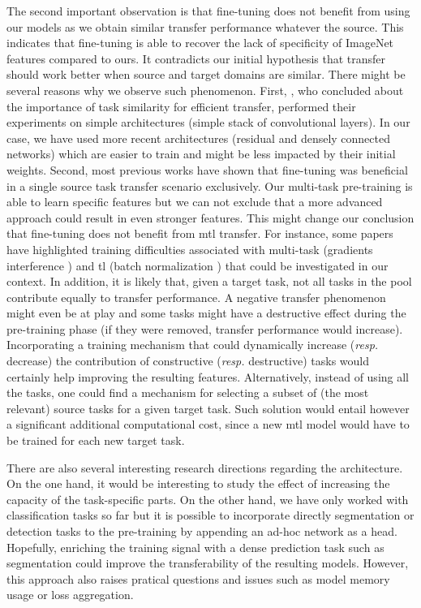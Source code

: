 The second important observation is that fine-tuning does not benefit from using our models as we obtain similar transfer performance whatever the source. This indicates that fine-tuning is able to recover the lack of specificity of ImageNet features compared to ours. It contradicts our initial hypothesis that transfer should work better when source and target domains are similar. There might be several reasons why we observe such phenomenon. First, \citeauthor{yosinski2014transferable} \cite{yosinski2014transferable}, who concluded about the importance of task similarity for efficient transfer, performed their experiments on simple architectures (\eg simple stack of convolutional layers). In our case, we have used more recent architectures (\ie residual and densely connected networks) which are easier to train and might be less impacted by their initial weights. Second, most previous works have shown that fine-tuning was beneficial in a single source task transfer scenario exclusively. Our multi-task pre-training is able to learn specific features but we can not exclude that a more advanced approach could result in even stronger features. This might change our conclusion that fine-tuning does not benefit from \acrshort{mtl} transfer. For instance, some papers have highlighted training difficulties associated with multi-task (\eg gradients interference \cite{yu2020gradient}) and \acrlong{tl} (\eg batch normalization \cite{chang2019domain}) that could be investigated in our context. In addition, it is likely that, given a target task, not all tasks in the pool contribute equally to transfer performance. A negative transfer phenomenon might even be at play and some tasks might have a destructive effect during the pre-training phase (\ie if they were removed, transfer performance would increase). Incorporating a training mechanism that could dynamically increase (\textit{resp.} decrease) the contribution of constructive (\textit{resp.} destructive) tasks would certainly help improving the resulting features. Alternatively, instead of using all the tasks, one could find a mechanism for selecting a subset of (the most relevant) source tasks for a given target task. Such solution would entail however a significant additional computational cost, since a new \acrshort{mtl} model would have to be trained for each new target task.

There are also several interesting research directions regarding the architecture. On the one hand, it would be interesting to study the effect of increasing the capacity of the task-specific parts. On the other hand, we have only worked with classification tasks so far but it is possible to incorporate directly segmentation or detection tasks to the pre-training by appending an ad-hoc network as a head. Hopefully, enriching the training signal with a dense prediction task such as segmentation could improve the transferability of the resulting models. However, this approach also raises pratical questions and issues such as model memory usage or loss aggregation. 

